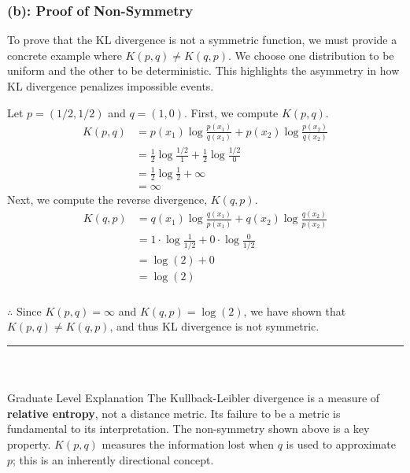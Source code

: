 \documentclass{article}
\begin{document}
\subsubsection*{(b): Proof of Non-Symmetry}
\parbox{\textwidth}{
To prove that the KL divergence is not a symmetric function, we must provide a concrete example where $K(p, q) \neq K(q, p)$. We choose one distribution to be uniform and the other to be deterministic. This highlights the asymmetry in how KL divergence penalizes impossible events.
}
\parbox{\textwidth}{
Let $p = (1/2, 1/2)$ and $q = (1, 0)$. First, we compute $K(p, q)$.
\begin{align*}
    K(p, q) &= p(x_1) \log\frac{p(x_1)}{q(x_1)} + p(x_2) \log\frac{p(x_2)}{q(x_2)} \\
    &= \frac{1}{2} \log\frac{1/2}{1} + \frac{1}{2} \log\frac{1/2}{0} \\
    &= \frac{1}{2} \log\frac{1}{2} + \infty \\
    &= \infty
\end{align*}
Next, we compute the reverse divergence, $K(q, p)$.
\begin{align*}
    K(q, p) &= q(x_1) \log\frac{q(x_1)}{p(x_1)} + q(x_2) \log\frac{q(x_2)}{p(x_2)} \\
    &= 1 \cdot \log\frac{1}{1/2} + 0 \cdot \log\frac{0}{1/2} \\
    &= \log(2) + 0 \\
    &= \log(2)
\end{align*}
}
\subsubsection*{\normalfont}{$\therefore$ Since $K(p, q) = \infty$ and $K(q, p) = \log(2)$, we have shown that $K(p, q) \neq K(q, p)$, and thus KL divergence is not symmetric.}

\noindent\rule{\textwidth}{0.4pt}\\

\newpage

\subsubsection*{\normalfont}{Graduate Level Explanation}
The Kullback-Leibler divergence is a measure of \textbf{relative entropy}, not a distance metric. Its failure to be a metric is fundamental to its interpretation. The non-symmetry shown above is a key property. $K(p, q)$ measures the information lost when $q$ is used to approximate $p$; this is an inherently directional concept.
\end{document}
